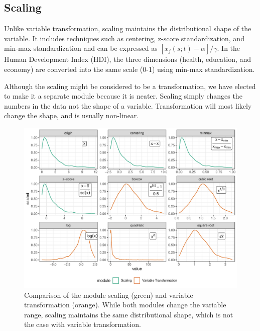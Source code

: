 \documentclass[
]{interact}
\begin{document}
\hypertarget{scaling}{%
\subsection{Scaling}\label{scaling}}

Unlike variable transformation, scaling maintains the distributional
shape of the variable. It includes techniques such as centering, z-score
standardization, and min-max standardization and can be expressed as
\([x_{j}(s;t) - \alpha]/\gamma\). In the Human Development Index (HDI),
the three dimensions (health, education, and economy) are converted into
the same scale (0-1) using min-max standardization.

Although the scaling might be considered to be a transformation, we have
elected to make it a separate module because it is neater. Scaling
simply changes the numbers in the data not the shape of a variable.
Transformation will most likely change the shape, and is usually
non-linear.

\begin{figure}

{\centering \includegraphics{tidyindex_files/figure-pdf/fig-scale-var-trans-compare-1.pdf}

}

\caption{\label{fig-scale-var-trans-compare}Comparison of the module
scaling (green) and variable transformation (orange). While both modules
change the variable range, scaling maintains the same distributional
shape, which is not the case with variable transformation.}

\end{figure}
\end{document}
